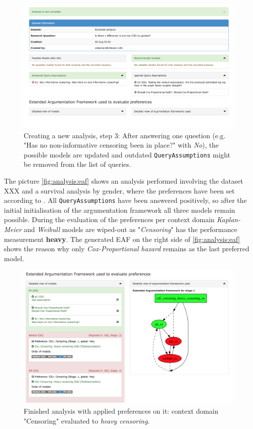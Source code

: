\begin{figure}[h]
\centering
\includegraphics[width=\textwidth]{figures/ui_analysis_2_no}
\caption{Creating a new analysis, step 3: After answering one question (e.g. "Has no non-informative censoring been in place?" with \textit{No}), the possible models are updated and outdated \texttt{QueryAssumptions} might be removed from the list of queries.}
\label{fig:analysis:3_no}
\end{figure}

The picture \autoref{fig:analysis:eaf} shows an analysis performed involving the dataset XXX and a survival analysis by gender, where the preferences have been set according to \cite{sassoon2016CD}. All \texttt{QueryAssumptions} have been answered positively, so after the initial initialisation of the argumentation framework all three models remain possible. During the evaluation of the preferences per context domain \textit{Kaplan-Meier} and \textit{Weibull} models are wiped-out as "\textit{Censoring}" has the performance measurement \textbf{heavy}. The generated \gls{EAF} on the right side of \autoref{fig:analysis:eaf} shows the reason why only \textit{Cox-Proportional hazard} remains as the last preferred model.

\begin{figure}[h]
\centering
\includegraphics[width=\textwidth]{figures/ui_analysis_eaf}
\caption{Finished analysis with applied preferences on it: context domain "Censoring" evaluated to \textit{heavy censoring}. }
\label{fig:analysis:eaf}
\end{figure}

